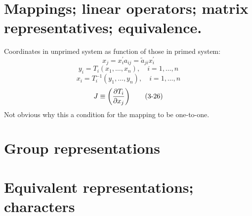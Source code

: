 \documentclass{book}
\begin{document}
\section{}
\section{Mappings; linear operators; matrix representatives; equivalence.}

Coordinates in unprimed system as function of those in primed system:
\begin{equation}
x_j = x^\prime_ia_{ij} = \tilde a_{ji}x^\prime_i\tag{3-16}
\end{equation}
\begin{equation}
y_i = T_i(x_1,\dots,x_n), \quad i=1,\dots,n\tag{3-25}
\end{equation}
\begin{equation}
x_i = T^{-1}_i(y_1,\dots,y_n), \quad i=1,\dots,n\tag{3-25a}
\end{equation}
\begin{equation}
J \equiv \left( \partial T_i\over\partial x_j \right) \tag{3-26}
\end{equation}
Not obvious why this a condition for the mapping to be one-to-one.

\section{Group representations}
\section{Equivalent representations; characters}
\end{document}
